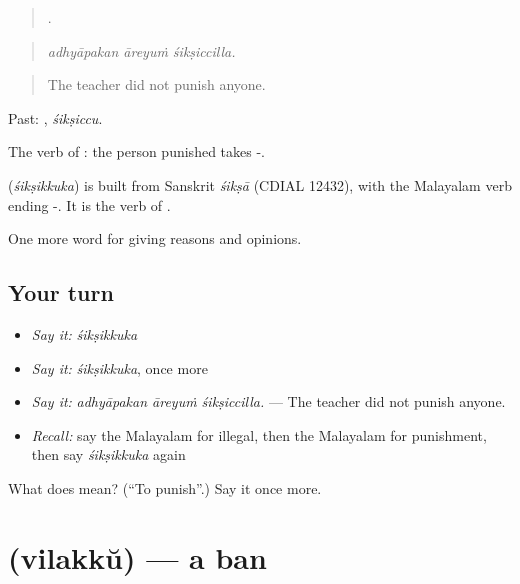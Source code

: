 \begin{quote}
  .
\end{quote}

\begin{quote}
\emph{adhyāpakan āreyuṁ śikṣiccilla.}
\end{quote}

\begin{quote}
The teacher did not punish anyone.
\end{quote}

Past: , \emph{śikṣiccu}.

The verb of : the person punished takes -.

\begin{cousinweb}
\textbf{} (\emph{śikṣikkuka}) is built from Sanskrit \emph{śikṣā} (CDIAL 12432), with the Malayalam verb ending -. It is the verb of .
\end{cousinweb}

\begin{grammarlens}[title={What you've built}]
One more word for giving reasons and opinions.
\end{grammarlens}

\subsection*{Your turn}
\begin{itemize}
\raggedright
  \item \emph{Say it:} \emph{śikṣikkuka}
  \item \emph{Say it:} \emph{śikṣikkuka}, once more
  \item \emph{Say it:} \emph{adhyāpakan āreyuṁ śikṣiccilla.} — The teacher did not punish anyone.
  \item \emph{Recall:} say the Malayalam for illegal, then the Malayalam for punishment, then say \emph{śikṣikkuka} again
\end{itemize}

\begin{tcolorbox}[breakable,colback=teal!4,colframe=teal!35!black,title={Before you move on}]
What does  mean? (\textquotedblleft{}To punish\textquotedblright{}.) Say it once more.
\end{tcolorbox}
\section[\texorpdfstring{\ml{വിലക്ക്} (vilakkŭ)}{വിലക്ക് (vilakkŭ)}]{ (vilakkŭ) — a ban}

